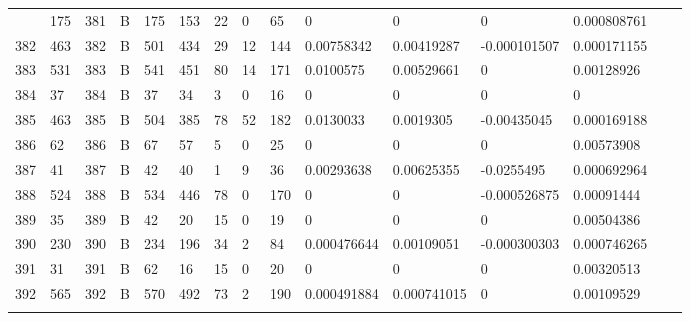 \begin{longtable}{lllllllllllllll}
\begin{comment}
	381 & 175               & 381 & B   & 175               & 153               & 22                & 0    & 65         & 0              & 0              & 0             & 0.000808761  \\
	382 & 463               & 382 & B   & 501               & 434               & 29                & 12   & 144        & 0.00758342     & 0.00419287     & -0.000101507  & 0.000171155  \\
	383 & 531               & 383 & B   & 541               & 451               & 80                & 14   & 171        & 0.0100575      & 0.00529661     & 0             & 0.00128926   \\
	384 & 37                & 384 & B   & 37                & 34                & 3                 & 0    & 16         & 0              & 0              & 0             & 0            \\
	385 & 463               & 385 & B   & 504               & 385               & 78                & 52   & 182        & 0.0130033      & 0.0019305      & -0.00435045   & 0.000169188  \\
	386 & 62                & 386 & B   & 67                & 57                & 5                 & 0    & 25         & 0              & 0              & 0             & 0.00573908   \\
	387 & 41                & 387 & B   & 42                & 40                & 1                 & 9    & 36         & 0.00293638     & 0.00625355     & -0.0255495    & 0.000692964  \\
	388 & 524               & 388 & B   & 534               & 446               & 78                & 0    & 170        & 0              & 0              & -0.000526875  & 0.00091444   \\
	389 & 35                & 389 & B   & 42                & 20                & 15                & 0    & 19         & 0              & 0              & 0             & 0.00504386   \\
	390 & 230               & 390 & B   & 234               & 196               & 34                & 2    & 84         & 0.000476644    & 0.00109051     & -0.000300303  & 0.000746265  \\
	391 & 31                & 391 & B   & 62                & 16                & 15                & 0    & 20         & 0              & 0              & 0             & 0.00320513   \\
	392 & 565               & 392 & B   & 570               & 492               & 73                & 2    & 190        & 0.000491884    & 0.000741015    & 0             & 0.00109529   \\

\end{comment}
\end{longtable}
